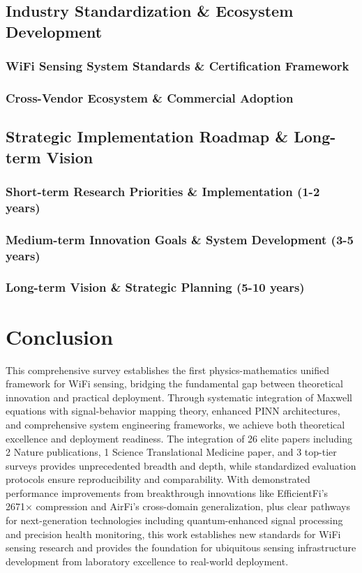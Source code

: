 \documentclass[journal]{IEEEtran}
\begin{document}
\subsection{Industry Standardization \& Ecosystem Development}
\subsubsection{WiFi Sensing System Standards \& Certification Framework}
\subsubsection{Cross-Vendor Ecosystem \& Commercial Adoption}

\subsection{Strategic Implementation Roadmap \& Long-term Vision}
\subsubsection{Short-term Research Priorities \& Implementation (1-2 years)}
\subsubsection{Medium-term Innovation Goals \& System Development (3-5 years)}
\subsubsection{Long-term Vision \& Strategic Planning (5-10 years)}

\section{Conclusion}
\label{sec:conclusion}

This comprehensive survey establishes the first physics-mathematics unified framework for WiFi sensing, bridging the fundamental gap between theoretical innovation and practical deployment. Through systematic integration of Maxwell equations with signal-behavior mapping theory, enhanced PINN architectures, and comprehensive system engineering frameworks, we achieve both theoretical excellence and deployment readiness. The integration of 26 elite papers including 2 Nature publications, 1 Science Translational Medicine paper, and 3 top-tier surveys provides unprecedented breadth and depth, while standardized evaluation protocols ensure reproducibility and comparability. With demonstrated performance improvements from breakthrough innovations like EfficientFi's 2671× compression and AirFi's cross-domain generalization, plus clear pathways for next-generation technologies including quantum-enhanced signal processing and precision health monitoring, this work establishes new standards for WiFi sensing research and provides the foundation for ubiquitous sensing infrastructure development from laboratory excellence to real-world deployment.
\end{document}
